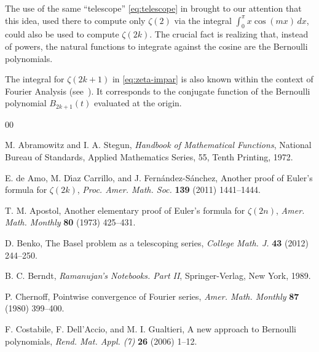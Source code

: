 \documentclass[10pt,reqno]{amsart}
\theoremstyle{remark}
\begin{document}
The use of the same ``telescope'' \eqref{eq:telescope} in \cite{Ben} brought to our attention that this idea, used there to compute only $\zeta(2)$ via the integral $\int_{0}^{\pi} x \cos(mx) \, dx$, could also be used to compute $\zeta(2k)$. The crucial fact is realizing that, instead of powers, the natural functions to integrate against the cosine are the Bernoulli polynomials.

The integral for $\zeta(2k+1)$ in \eqref{eq:zeta-impar} is also known within the context of Fourier Analysis (see~\cite{Hauss}). It corresponds to the conjugate function of the Bernoulli polynomial $B_{2k+1}(t)$ evaluated at the origin. 


\begin{thebibliography}{00}

{M. Abramowitz and I. A. Stegun}, 
\textit{Handbook of Mathematical Functions},
National Bureau of Standards, Applied Mathematics Series, 
{55}, Tenth Printing, 1972.

{E. de Amo, M. D\'{\i}az Carrillo, and J. Fern\'{a}ndez-S\'{a}nchez},
Another proof of Euler's formula for $\zeta(2k)$,
\textit{Proc. Amer. Math. Soc.} 
\textbf{139} (2011) 1441--1444.

{T. M. Apostol},
Another elementary proof of Euler's formula for $\zeta(2n)$, 
\textit{Amer. Math. Monthly}
\textbf{80} (1973) 425--431.

{D. Benko}, 
The Basel problem as a telescoping series,
\textit{College Math. J.} %
\textbf{43} (2012) 244--250.

{B. C. Berndt}, 
\textit{Ramanujan's Notebooks. Part II}, 
Springer-Verlag, New York, 1989. 


{P. Chernoff}, 
Pointwise convergence of Fourier series,
\textit{Amer. Math. Monthly}
\textbf{87} (1980) 399--400.

{F. Costabile, F. Dell'Accio, and M. I. Gualtieri}, 
A new approach to Bernoulli polynomials, 
\textit{Rend. Mat. Appl. (7)}
\textbf{26} (2006) 1--12.


\end{thebibliography}
\end{document}
